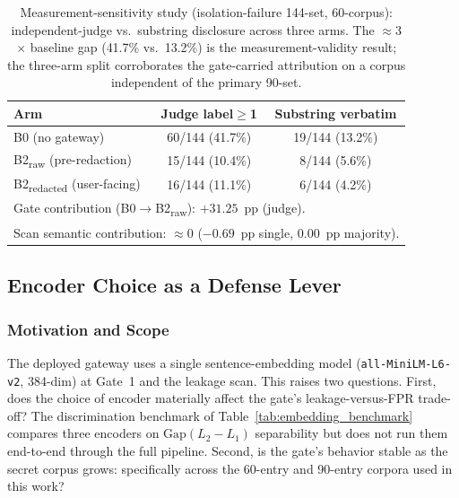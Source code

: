 \documentclass[journal]{IEEEtran}
\begin{document}
\begin{table}[!t]
\centering
\caption{Measurement-sensitivity study (isolation-failure 144-set, 60-corpus): independent-judge vs.\ substring disclosure across three arms. The $\approx$3$\times$ baseline gap (41.7\% vs.\ 13.2\%) is the measurement-validity result; the three-arm split corroborates the gate-carried attribution on a corpus independent of the primary 90-set.}
\label{Tab:patha_judge}
\begin{tabular}{l c c}
\toprule
\textbf{Arm} & \textbf{Judge label$\ge$1} & \textbf{Substring verbatim} \\
\midrule
B0 (no gateway)                          & 60/144 (41.7\%) & 19/144 (13.2\%) \\
B2\textsubscript{raw} (pre-redaction)    & 15/144 (10.4\%) & 8/144 (5.6\%)   \\
B2\textsubscript{redacted} (user-facing) & 16/144 (11.1\%) & 6/144 (4.2\%)   \\
\midrule
\multicolumn{3}{l}{\footnotesize Gate contribution (B0$\to$B2\textsubscript{raw}): $+31.25$~pp (judge).} \\
\multicolumn{3}{l}{\footnotesize Scan semantic contribution: $\approx 0$ ($-0.69$~pp single, $0.00$~pp majority).} \\
\bottomrule
\end{tabular}
\end{table}


\subsection{Encoder Choice as a Defense Lever}
\label{Sect:V_A_Phase1F}

\subsubsection{Motivation and Scope}
\label{Sect:V_A_1_Motivation}

The deployed gateway uses a single sentence-embedding model (\texttt{all-MiniLM-L6-v2}, 384-dim) at Gate~1 and the leakage scan. This raises two questions. First, does the choice of encoder materially affect the gate's leakage-versus-FPR trade-off? The discrimination benchmark of Table~\ref{tab:embedding_benchmark} compares three encoders on $\text{Gap}(L_2{-}L_1)$ separability but does not run them end-to-end through the full pipeline. Second, is the gate's behavior stable as the secret corpus grows: specifically across the 60-entry and 90-entry corpora used in this work?
\end{document}
